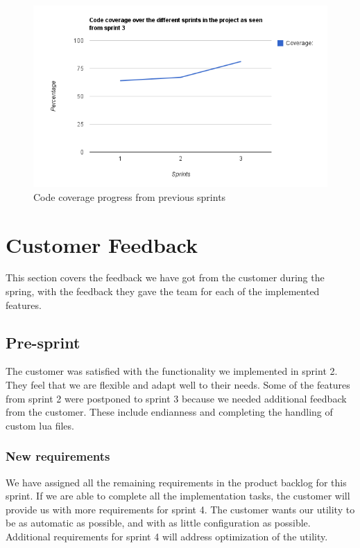 \begin{figure}[ht]
	\center
	\includegraphics[width=\textwidth]{./sprints/img/sprint3_code_coverage_chart.png}
	\caption{Code coverage progress from previous sprints\label{fig:sp3CoverageChart}}
\end{figure}


\section{Customer Feedback}
\label{sec:sp3:feedback}
This section covers the feedback we have got from the customer during the 
spring, with the feedback they gave the team for each of the implemented 
features.

\subsection{Pre-sprint}
The customer was satisfied with the functionality we implemented in sprint 2.
They feel that we are flexible and adapt well to their needs.
Some of the features from sprint 2 were postponed to sprint 3 because we needed additional feedback from the customer.
These include \gls{endianness} and completing the handling of custom \Gls{lua} files.

\subsubsection{New requirements}
We have assigned all the remaining requirements in the product backlog for this sprint.
If we are able to complete all the implementation tasks, the customer will provide us with more requirements for sprint 4.
The customer wants our \gls{utility} to be as automatic as possible, and with as little configuration as possible. 
Additional requirements for sprint 4 will address optimization of the \gls{utility}.

